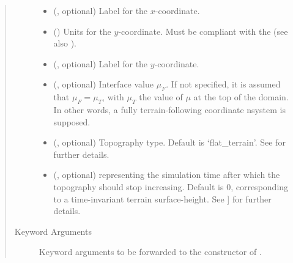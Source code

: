 \documentclass[letterpaper,10pt,english]{sphinxmanual}
\begin{document}
\begin{fulllineitems}
\begin{fulllineitems}
\begin{quote}
\begin{description}
\begin{itemize}
\item {} 
 (, optional) \textendash{} Label for the \(x\)-coordinate.

\item {} 
\sphinxstyleliteralstrong{, } () \textendash{} 
Units for the \(y\)-coordinate. Must be compliant with the 
(see also {\hyperref[\detokenize{api:tasmania.grids.axis.Axis.__init__}]{}}).


\item {} 
 (, optional) \textendash{} Label for the \(y\)-coordinate.

\item {} 
 (, optional) \textendash{} Interface value \(\mu_F\). If not specified, it is assumed that \(\mu_F = \mu_T\), with
\(\mu_T\) the value of \(\mu\) at the top of the domain. In other words, a fully terrain-following
coordinate nsystem is supposed.

\item {} 
 (, optional) \textendash{} Topography type. Default is ‘flat\_terrain’. See {\hyperref[\detokenize{api:module-tasmania.grids.topography}]{}} for further details.

\item {} 
 (, optional) \textendash{}  representing the simulation time after which the topography should stop increasing.
Default is 0, corresponding to a time-invariant terrain surface-height. See {\hyperref[\detokenize{api:module-tasmania.grids.topography}]{}} {]}
for further details.

\end{itemize}

\item[{Keyword Arguments}] \leavevmode
{} \textendash{} Keyword arguments to be forwarded to the constructor of {\hyperref[\detokenize{api:tasmania.grids.topography.Topography2d}]{}}.

\end{description}\end{quote}


\end{fulllineitems}
\end{fulllineitems}
\end{document}
